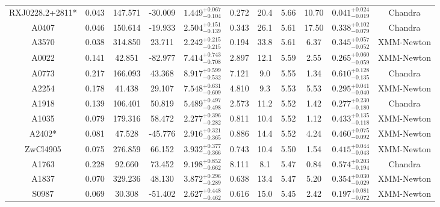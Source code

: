 \documentclass{aa}   %
\begin{document}
\begin{table}[h!]
\begin{center}
\begin{tabular}{ c  c  c  c c c c c c c c }
RXJ0228.2+2811*     		&		0.043	&	147.571	&	-30.009	& $	1.449^{+0.067}_{-0.104}$  &      0.272	&  20.4	&	5.66	&	10.70	&	$ 0.041^{+0.024}_{-0.019}  $ &	 Chandra      \\
A0407               		&		0.046	&	150.614	&	-19.933	& $	2.504^{+0.151}_{-0.139}$  &      0.343	&  26.1	&	5.61	&	17.50	&	$ 0.338^{+0.102}_{-0.079}  $ &	 Chandra      \\
A3570               		&		0.038	&	314.850	&	23.711	& $	2.242^{+0.215}_{-0.215}$  &      0.194	&  33.8	&	5.61	&	6.37	&	$ 0.345^{+0.057}_{-0.052}  $ &	 XMM-Newton   \\
A0022               		&		0.141	&	42.851	&	-82.977	& $	7.414^{+0.743}_{-0.708}$  &      2.897	&  12.1	&	5.59	&	2.55	&	$ 0.265^{+0.060}_{-0.059}  $ &	  XMM-Newton  \\
A0773               		&		0.217	&	166.093	&	43.368	& $	8.917^{+0.599}_{-0.532}$  &      7.121	&  9.0	&	5.55	&	1.34	&	$ 0.610^{+0.128}_{-0.135}  $ &	  Chandra     \\
A2254               		&		0.178	&	41.438	&	29.107	& $	7.548^{+0.631}_{-0.609}$  &      4.810	&  9.3	&	5.53	&	5.53	&	$ 0.295^{+0.041}_{-0.040}  $ &	 XMM-Newton   \\
A1918               		&		0.139	&	106.401	&	50.819	& $	5.489^{+0.497}_{-0.498}$  &      2.573	&  11.2	&	5.52	&	1.42	&	$ 0.277^{+0.230}_{-0.180}  $ &	  Chandra     \\
A1035               		&		0.079	&	179.316	&	58.472	& $	2.277^{+0.396}_{-0.282}$  &      0.811	&  10.4	&	5.52	&	1.12	&	$ 0.433^{+0.135}_{-0.118}  $ &	  XMM-Newton  \\
A2402*              		&		0.081	&	47.528	&	-45.776	& $	2.916^{+0.321}_{-0.365}$  &      0.886	&  14.4	&	5.52	&	4.24	&	$ 0.460^{+0.075}_{-0.092}  $ &	  XMM-Newton  \\
ZwCl4905            		&		0.075	&	276.859	&	66.152	& $	3.932^{+0.377}_{-0.366}$  &      0.743	&  10.4	&	5.50	&	1.54	&	$ 0.415^{+0.044}_{-0.043}  $ &	  XMM-Newton  \\
A1763               		&		0.228	&	92.660	&	73.452	& $	9.198^{+0.852}_{-0.662}$  &      8.111	&  8.1	&	5.47	&	0.84	&	$ 0.574^{+0.203}_{-0.194}  $ &	  Chandra     \\
A1837               		&		0.070	&	329.236	&	48.130	& $	3.872^{+0.296}_{-0.289}$  &      0.638	&  13.4	&	5.47	&	5.20	&	$ 0.354^{+0.030}_{-0.029}  $ &	  XMM-Newton  \\
S0987               		&		0.069	&	30.308	&	-51.402	& $	2.627^{+0.448}_{-0.462}$  &      0.616	&  15.0	&	5.45	&	2.42	&	$ 0.197^{+0.081}_{-0.072}  $ &	  XMM-Newton  \\

\end{tabular}
\end{center}
\end{table}
\end{document}
